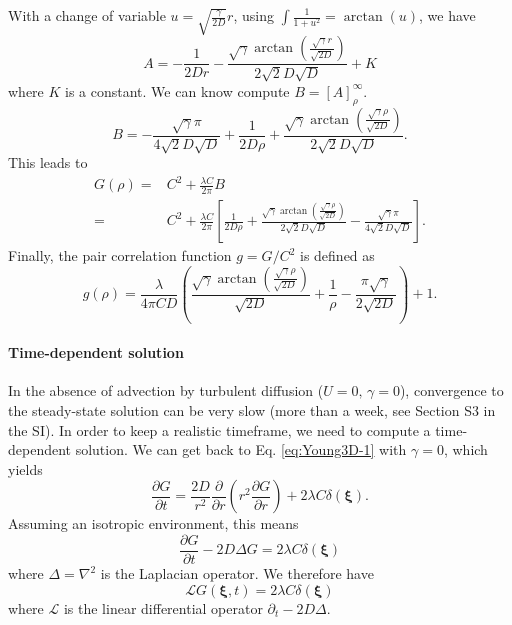 \documentclass[12pt,english]{article}
\begin{document}
With a change of variable $u=\sqrt{\frac{\gamma}{2D}}r$, using $\int\frac{1}{1+u^{2}}=\arctan(u)$,
we have 
\begin{equation}
A=-\frac{1}{2Dr}-\frac{\sqrt{\gamma}\arctan\left(\frac{\sqrt{\gamma}r}{\sqrt{2D}}\right)}{2\sqrt{2}D\sqrt{D}}+K
\end{equation}
where $K$ is a constant. We can know compute $B=[A]_{\rho}^{\infty}.$
\begin{equation}
B=-\frac{\sqrt{\gamma}\pi}{4\sqrt{2}D\sqrt{D}}+\frac{1}{2D\rho}+\frac{\sqrt{\gamma}\arctan\left(\frac{\sqrt{\gamma}\rho}{\sqrt{2D}}\right)}{2\sqrt{2}D\sqrt{D}}.
\end{equation}
This leads to 
\begin{align}
G(\rho)= & C^{2}+\frac{\lambda C}{2\pi}B\\
= & C^{2}+\frac{\lambda C}{2\pi}\left[\frac{1}{2D\rho}+\frac{\sqrt{\gamma}\arctan\left(\frac{\sqrt{\gamma}\rho}{\sqrt{2D}}\right)}{2\sqrt{2}D\sqrt{D}}-\frac{\sqrt{\gamma}\pi}{4\sqrt{2}D\sqrt{D}}\right].
\end{align}
Finally, the pair correlation function $g=G/C^{2}$ is defined as
\begin{equation}
g(\rho)=\frac{\lambda}{4\pi CD}\left(\frac{\sqrt{\gamma}\arctan\left(\frac{\sqrt{\gamma}\rho}{\sqrt{2D}}\right)}{\sqrt{2D}}+\frac{1}{\rho}-\frac{\pi\sqrt{\gamma}}{2\sqrt{2D}}\right)+1.\label{eq:pcf_adv_bbm}
\end{equation}


\paragraph{Time-dependent solution}

In the absence of advection by turbulent diffusion ($U=0,\,\gamma=0$),
convergence to the steady-state solution can be very slow (more than
a week, see Section S3 in the SI). In order to keep a realistic timeframe,
we need to compute a time-dependent solution. We can get back to Eq.
\ref{eq:Young3D-1} with $\gamma=0$, which yields 
\begin{equation}
\frac{\partial G}{\partial t}=\frac{2D}{r^{2}}\frac{\partial}{\partial r}\left(r^{2}\frac{\partial G}{\partial r}\right)+2\lambda C\delta(\boldsymbol{\xi}).\label{eq:G_no_adv}
\end{equation}
Assuming an isotropic environment, this means 
\begin{equation}
\frac{\partial G}{\partial t}-2D\Delta G=2\lambda C\delta(\boldsymbol{\xi})
\end{equation}
where $\Delta=\nabla^{2}$ is the Laplacian operator. We therefore
have 
\begin{equation}
\mathcal{L}G(\boldsymbol{\xi},t)=2\lambda C\delta(\boldsymbol{\xi})
\end{equation}
where $\mathcal{L}$ is the linear differential operator $\partial_{t}-2D\Delta$.
\end{document}
